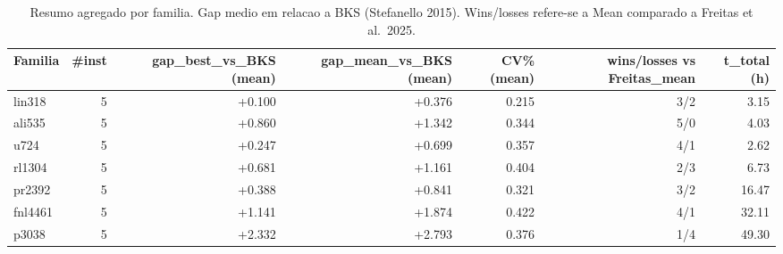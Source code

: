 \begin{table}[!htb]
\centering
\caption{Resumo agregado por familia. Gap medio em relacao a BKS (Stefanello 2015). Wins/losses refere-se a Mean comparado a Freitas et al.~2025.}
\label{tab:family}
\small
\begin{tabular}{lrrrrrr}
\hline
Familia & #inst & gap\_best\_vs\_BKS (mean) & gap\_mean\_vs\_BKS (mean) & CV\% (mean) & wins/losses vs Freitas\_mean & t\_total (h) \\
\hline
lin318 & 5 & +0.100 & +0.376 & 0.215 & 3/2 & 3.15 \\
ali535 & 5 & +0.860 & +1.342 & 0.344 & 5/0 & 4.03 \\
u724 & 5 & +0.247 & +0.699 & 0.357 & 4/1 & 2.62 \\
rl1304 & 5 & +0.681 & +1.161 & 0.404 & 2/3 & 6.73 \\
pr2392 & 5 & +0.388 & +0.841 & 0.321 & 3/2 & 16.47 \\
fnl4461 & 5 & +1.141 & +1.874 & 0.422 & 4/1 & 32.11 \\
p3038 & 5 & +2.332 & +2.793 & 0.376 & 1/4 & 49.30 \\
\hline
\end{tabular}
\end{table}
